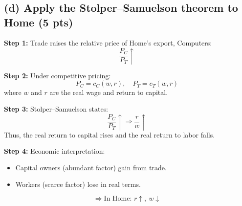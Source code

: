 \documentclass[12pt]{article}
\begin{document}
\vspace{0.4cm}

\subsection*{(d) Apply the Stolper--Samuelson theorem to Home (5 pts)}

\textbf{Step 1:} Trade raises the relative price of Home's export, Computers:
\[
\frac{P_C}{P_T} \uparrow
\]

\textbf{Step 2:} Under competitive pricing:
\[
P_C = c_C(w,r), \quad P_T = c_T(w,r)
\]
where $w$ and $r$ are the real wage and return to capital.

\textbf{Step 3:} Stolper--Samuelson states:
\[
\frac{P_C}{P_T} \uparrow \Rightarrow \frac{r}{w} \uparrow
\]
Thus, the real return to capital rises and the real return to labor falls.

\textbf{Step 4:} Economic interpretation:
\begin{itemize}
    \item Capital owners (abundant factor) gain from trade.
    \item Workers (scarce factor) lose in real terms.
\end{itemize}

\[
\Rightarrow \text{In Home: } r \uparrow, \ w \downarrow
\]
\end{document}
